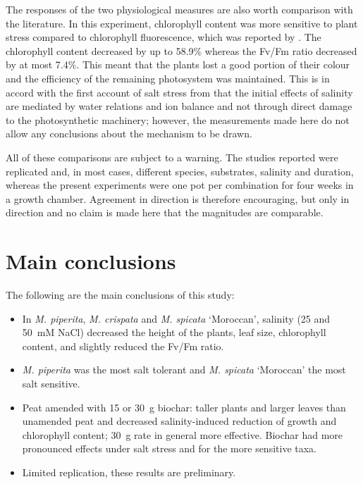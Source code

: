 The responses of the two physiological measures are also worth comparison with the literature. In this experiment, chlorophyll content was more sensitive to plant stress compared to chlorophyll fluorescence, which was reported by \textcite{Kalaji2021}. The chlorophyll content decreased by up to 58.9\% whereas the Fv/Fm ratio decreased by at most 7.4\%. This meant that the plants lost a good portion of their colour and the efficiency of the remaining photosystem was maintained. This is in accord with the first account of salt stress from \textcite{AcostaMotos2017} that the initial effects of salinity are mediated by water relations and ion balance and not through direct damage to the photosynthetic machinery; however, the measurements made here do not allow any conclusions about the mechanism to be drawn.

All of these comparisons are subject to a warning. The studies reported were replicated and, in most cases, different species, substrates, salinity and duration, whereas the present experiments were one pot per combination for four weeks in a growth chamber. Agreement in direction is therefore encouraging, but only in direction and no claim is made here that the magnitudes are comparable.

\section{Main conclusions}

The following are the main conclusions of this study:

\begin{itemize}
  \item In \textit{M. piperita}, \textit{M. crispata} and \textit{M. spicata} `Moroccan', salinity (25 and 50~mM NaCl) decreased the height of the plants, leaf size, chlorophyll content, and slightly reduced the Fv/Fm ratio.
  \item \textit{M. piperita} was the most salt tolerant and \textit{M. spicata} `Moroccan' the most salt sensitive.
  \item Peat amended with 15 or 30~g biochar: taller plants and larger leaves than unamended peat and decreased salinity-induced reduction of growth and chlorophyll content; 30~g rate in general more effective. Biochar had more pronounced effects under salt stress and for the more sensitive taxa.
  \item Limited replication, these results are preliminary.
\end{itemize}

